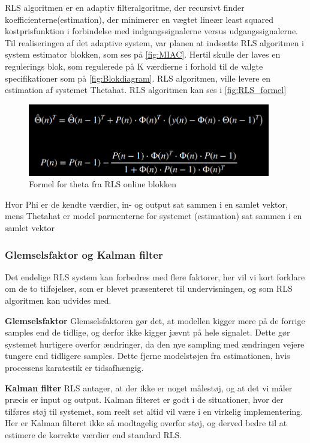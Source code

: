 RLS algoritmen er en adaptiv filteralgoritme, der recursivt finder koefficienterne(estimation), der minimerer en vægtet lineær least squared kostprisfunktion i forbindelse med indgangssignalerne versus udgangssignalerne. Til realiseringen af det adaptive system, var planen at indsætte RLS algoritmen i system estimator blokken, som ses på \autoref{fig:MIAC}. Hertil skulle der laves en regulerings blok, som regulerede på K værdierne i forhold til de valgte specifikationer som på \autoref{fig:Blokdiagram}.
RLS algoritmen, ville levere en estimation af systemet Thetahat. RLS algoritmen kan ses i \autoref{fig:RLS_formel} 


 \begin{figure}[H]
	\centering
	\includegraphics[width = 300pt]{figur/RLS_formel}
	\caption{Formel for theta fra RLS online blokken}
	\label{fig:RLS_formel}
\end{figure}
Hvor Phi er de kendte værdier, in- og output sat sammen i en samlet vektor,  mens Thetahat er model parmenterne for systemet (estimation) sat sammen i en samlet vektor 

\subsubsection{Glemselsfaktor og Kalman filter}  
Det endelige RLS system kan forbedres med flere faktorer, her vil vi kort forklare om de to tilføjelser, som er blevet præsenteret til undervisningen, og som RLS algoritmen kan udvides med.

\textbf{Glemselsfaktor}
Glemselsfaktoren gør det, at modellen kigger mere på de forrige samples end de tidlige, og derfor ikke kigger jævnt  på hele signalet. Dette gør systemet hurtigere overfor ændringer, da den nye sampling med ændringen vejere tungere end tidligere samples. Dette fjerne modelstøjen fra estimationen, hvis processens karatestik er tidsafhængig. 

\textbf{Kalman filter}
RLS antager, at der ikke er noget målestøj, og at det vi måler præcis er input og output. Kalman filteret er godt i de situationer, hvor der tilføres støj til systemet, som reelt set altid vil være i en virkelig implementering. Her er Kalman filteret ikke så modtagelig overfor støj, og derved bedre til at estimere de korrekte værdier end standard RLS.

